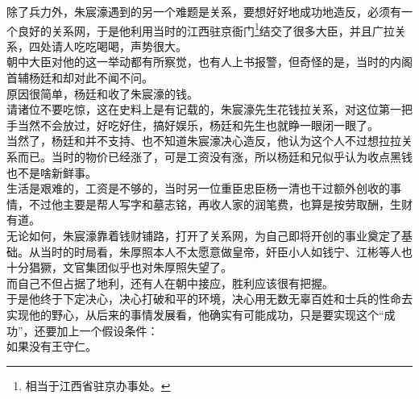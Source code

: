 \begin{multicols}{\theparacolNo}
除了兵力外，朱宸濠遇到的另一个难题是关系，要想好好地成功地造反，必须有一个良好的关系网，于是他利用当时的江西驻京衙门\footnote{相当于江西省驻京办事处。}结交了很多大臣，并且广拉关系，四处请人吃吃喝喝，声势很大。\\

朝中大臣对他的这一举动都有所察觉，也有人上书报警，但奇怪的是，当时的内阁首辅杨廷和却对此不闻不问。\\

原因很简单，杨廷和收了朱宸濠的钱。\\

请诸位不要吃惊，这在史料上是有记载的，朱宸濠先生花钱拉关系，对这位第一把手当然不会放过，好吃好住，搞好娱乐，杨廷和先生也就睁一眼闭一眼了。\\

当然了，杨廷和并不支持、也不知道朱宸濠决心造反，他认为这个人不过想拉拉关系而已。当时的物价已经涨了，可是工资没有涨，所以杨廷和兄似乎认为收点黑钱也不是啥新鲜事。\\

生活是艰难的，工资是不够的，当时另一位重臣忠臣杨一清也干过额外创收的事情，不过他主要是帮人写字和墓志铭，再收人家的润笔费，也算是按劳取酬，生财有道。\\

无论如何，朱宸濠靠着钱财铺路，打开了关系网，为自己即将开创的事业奠定了基础。从当时的时局看，朱厚照本人不太愿意做皇帝，奸臣小人如钱宁、江彬等人也十分猖獗，文官集团似乎也对朱厚照失望了。\\

而自己不但占据了地利，还有人在朝中接应，胜利应该很有把握。\\

于是他终于下定决心，决心打破和平的环境，决心用无数无辜百姓和士兵的性命去实现他的野心，从后来的事情发展看，他确实有可能成功，只是要实现这个“成功”，还要加上一个假设条件：\\

如果没有王守仁。\\
\ifnum{}
	\end{multicols}
\fi
\newpage
